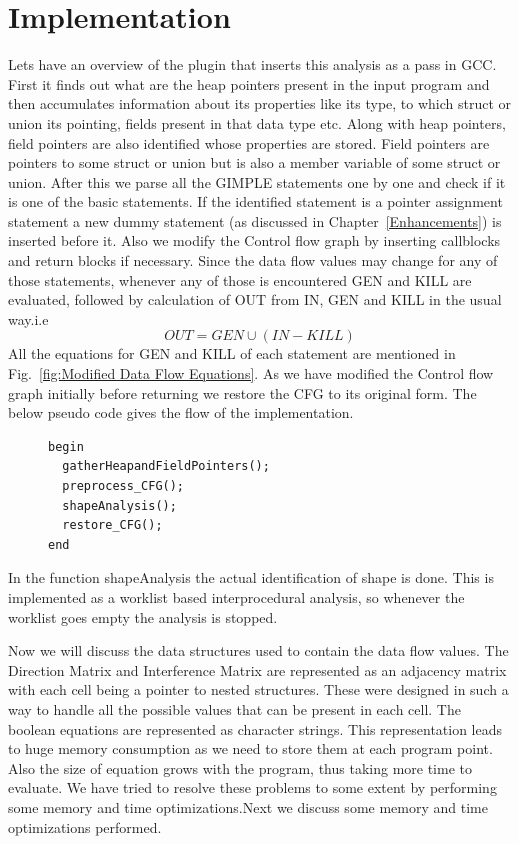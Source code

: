 \section{Implementation}
Lets have an overview of the plugin that inserts this analysis as a pass in GCC.
First it finds out what are the heap pointers present in the input program and then accumulates 
information about its properties like its type, to which struct or union its pointing, fields present in that data type etc.
Along with heap pointers, field pointers are also identified whose properties are stored. Field pointers are 
pointers to some struct or union but is also a member variable of some struct or union.
After this we parse all the GIMPLE statements one by one and check if it is one of the basic statements.
If the identified statement is a pointer assignment statement a new dummy statement (as discussed in Chapter~\ref{Enhancements}) is inserted before it.
Also we modify the Control flow graph by inserting callblocks and return blocks if necessary.
Since the data flow values may change for any of those statements, whenever any of those is encountered GEN and KILL are evaluated, followed by 
calculation of OUT from IN, GEN and KILL in the usual way.i.e  
\[
OUT = GEN \cup (IN - KILL)
\]
All the equations for GEN and KILL of each statement are mentioned in Fig.~\ref{fig:Modified Data Flow Equations}. As we have modified 
the Control flow graph initially before returning we restore the CFG to its original form. The below pseudo code gives the flow of the implementation.
\begin{figure}[h]
\begin{lstlisting}
begin
  gatherHeapandFieldPointers();
  preprocess_CFG();  
  shapeAnalysis();
  restore_CFG();
end
\end{lstlisting}
\end{figure}
In the function shapeAnalysis the actual identification of shape is done. This is implemented as a 
worklist based interprocedural analysis, so whenever the worklist goes empty the analysis is stopped.

Now we will discuss the data structures used to 
contain the data flow values. The Direction Matrix and Interference Matrix  are represented as an adjacency matrix with each cell 
being a pointer to nested structures.
These were designed in such a way to handle all the possible values that can be present in each cell.
The boolean equations are represented as character strings. This representation leads to huge memory consumption as we need to store them at
each program point.
Also the size of equation grows with the program, thus taking more time to evaluate. We have tried to resolve these problems to some extent by 
performing some memory and time optimizations.Next we discuss some memory and time optimizations performed.
